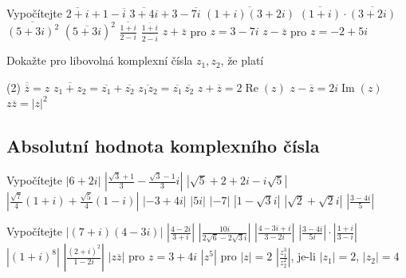 \begin{exerciseblock}[2]{Vypočítejte}
    \task $\overline{2+i}+1-\overline{i}$
    \task $\overline{3+4i}+3-\overline{7i}$
    \task $\overline{(1+i)(3+2i)}$
    \task $\overline{(1+i)}\cdot\overline{(3+2i)}$
    \task $\overline{(5+3i)^2}$
    \task $\left(\overline{5+3i}\right)^2$
    \task $\displaystyle \overline{\frac{1+i}{2-i}}$
    \task $\displaystyle \frac{\overline{1+i}}{\overline{2-i}}$
    \task $z+\overline z$ pro $z=3-7i$
    \task $z-\overline z$ pro $z=-2+5i$
\end{exerciseblock}


\begin{exercise}{Dokažte pro libovolná komplexní čísla $z_1,z_2$, že platí}
    \begin{tasks}(2)
        \task $\overline{\overline z}=z$
        \task $\overline{z_1+z_2}=\overline{z_1}+\overline{z_2}$
        \task $\overline{z_1z_2}=\overline{z_1}\,\overline{z_2}$
        \task $z+\overline z=2\operatorname{Re}(z)$
        \task $z-\overline z=2i\operatorname{Im}(z)$
        \task $z\overline z=|z|^2$
    \end{tasks}
\end{exercise}



\subsection*{Absolutní hodnota komplexního čísla}

\begin{exerciseblock}[2]{Vypočítejte}
    \task $|6+2i|$
    \task $\left|\frac{\sqrt3+1}{3}-\frac{\sqrt3-1}{3}i\right|$
    \task $|\sqrt5+2+2i-i\sqrt5|$
    \task $\left|\frac{\sqrt7}{4}(1+i)+\frac{\sqrt5}{4}(1-i)\right|$
    \task $|-3+4i|$
    \task $|5i|$
    \task $|-7|$
    \task $|1-\sqrt3 i|$
    \task $|\sqrt2+\sqrt2 i|$
    \task $\left|\frac{3-4i}{5}\right|$
\end{exerciseblock}


\begin{exerciseblock}[2]{Vypočítejte}
    \task $|(7+i)(4-3i)|$
    \task $\left|\frac{4-2i}{3+i}\right|$
    \task $\left|\frac{10i}{2\sqrt6-2\sqrt3 i}\right|$
    \task $\left|\frac{4-3i+i}{3-2i}\right|$
    \task $\left|\frac{3-4i}{5i}\right|\cdot\left|\frac{1+i}{3-i}\right|$
    \task $|(1+i)^8|$
    \task $\left|\frac{(2+i)^2}{1-2i}\right|$
    \task $|z\overline z|$ pro $z=3+4i$
    \task $|z^5|$ pro $|z|=2$
    \task $\left|\frac{z_1^3}{z_2^2}\right|$, je-li $|z_1|=2$, $|z_2|=4$
\end{exerciseblock}


